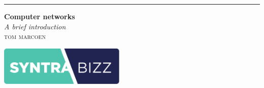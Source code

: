 


\begin{titlingpage} %
\thispagestyle{empty}
	\raggedleft %
	
	\rule{1pt}{\textheight} %
	\hspace{0.05\textwidth} %
	\parbox[b]{0.75\textwidth}{ %
		
		{\Huge\bfseries Computer networks}\\[2\baselineskip] %
		{\large\textit{A brief introduction}}\\[4\baselineskip] %
		{\Large\textsc{tom marcoen}} %
		
		\vspace{0.5\textheight} %
		
		{\noindent \includegraphics[width=6cm]{images/logo-cropped.pdf}}\\[\baselineskip] %
	}

\end{titlingpage}